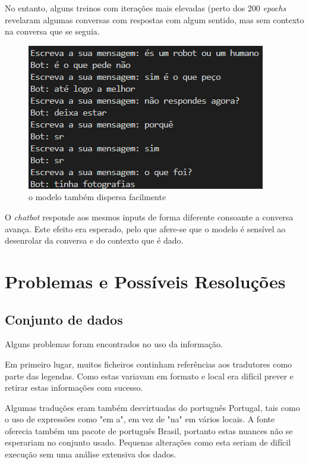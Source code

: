 \documentclass{article}
\begin{document}
No entanto, alguns treinos com iterações mais elevadas (perto dos 200 \textit{epochs} revelaram algumas conversas com respostas com algum sentido, mas sem contexto na conversa que se seguia.
\begin{figure}[htb]
    \centering
    \includegraphics[scale=0.7]{chat2}
    \caption{o modelo também dispersa facilmente}
    \label{chat3}
\end{figure}

O \textit{chatbot} responde aos mesmos inputs de forma diferente consoante a conversa avança. Este efeito era esperado, pelo que afere-se que o modelo é sensível ao desenrolar da conversa e do contexto que é dado.

\section{Problemas e Possíveis Resoluções}

\subsection{Conjunto de dados}
Alguns problemas foram encontrados no uso da informação.

Em primeiro lugar, muitos ficheiros continham referências aos tradutores como parte das legendas. Como estas variavam em formato e local era difícil prever e retirar estas informações com sucesso.

Algumas traduções eram também desvirtuadas do português Portugal, tais como o uso de expressões como "em a", em vez de "na" em vários locais. A fonte oferecia também um pacote de português Brasil, portanto estas nuances não se esperariam no conjunto usado. Pequenas alterações como esta seriam de difícil execução sem uma análise extensiva dos dados.
\end{document}
